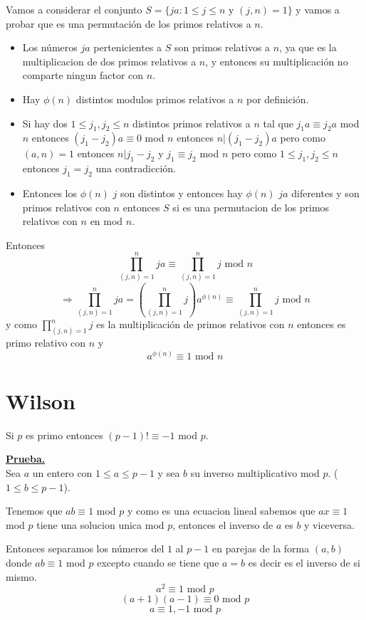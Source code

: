 \documentclass[11pt]{scrartcl}
\begin{document}
Vamos a considerar el conjunto $S=\{ja: 1\leq j \leq n \text{ y } (j,n)=1\}$ y vamos a probar que es una permutación de los primos relativos a $n$.
\begin{itemize}
\item Los números $ja$ pertenicientes a $S$ son primos relativos a $n$, ya que es la multiplicacion de dos primos relativos a $n$, y entonces su multiplicación no comparte ningun factor con $n$.
\item Hay $\phi (n)$ distintos modulos primos relativos a $n$ por definición.
\item Si hay dos $1\leq j_1,j_2 \leq n$ distintos primos relativos a $n$ tal que $j_1a\equiv j_2 a$ mod $n$ entonces $(j_1-j_2)a\equiv 0$ mod $n$ entonces $n|(j_1-j_2)a$ pero como $(a,n)=1$ entonces $n|j_1-j_2$ y $j_1\equiv j_2$ mod $n$ pero como $1\leq j_1,j_2 \leq n$ entonces $j_1=j_2$ una contradicción.
\item Entonces los $\phi (n)$ $j$ son distintos y entonces hay $\phi (n)$ $ja$ diferentes y son primos relativos con $n$ entonces $S$ si es una permutacion de los primos relativos con $n$ en mod $n$.
\end{itemize}
Entonces 
$$\prod_{(j,n)=1}^{n} ja \equiv \prod_{(j,n)=1}^{n} j \text{ mod } n $$
$$\Rightarrow \prod_{(j,n)=1}^{n} ja = (\prod_{(j,n)=1}^{n}j) a^{\phi (n)} \equiv \prod_{(j,n)=1}^{n} j \text{ mod } n$$
y como $\prod_{(j,n)=1}^{n} j$ es la multiplicación de primos relativos con $n$ entonces es primo relativo con $n$ y 
$$a^{\phi(n)}\equiv 1 \text{ mod } n$$


\section{Wilson}
\begin{theorem}
Si $p$ es primo entonces $(p-1)! \equiv -1$ mod $p$. 
\end{theorem}

\underline{\textbf{Prueba.}} \\

Sea $a$ un entero con $1\leq a \leq p-1$ y sea $b$ su inverso multiplicativo mod $p$. ($1\leq b \leq p-1$).

Tenemos que $ab\equiv 1$ mod $p$  y como es una ecuacion lineal sabemos que $ax\equiv 1$ mod $p$ tiene una solucion unica mod $p$, entonces el inverso de $a$ es $b$ y viceversa.

Entonces separamos los números del $1$ al $p-1$ en parejas de la forma $(a,b)$ donde $ab\equiv 1$ mod $p$ excepto cuando se tiene que $a=b$ es decir es el inverso de si mismo.
$$a^2\equiv 1 \text{ mod } p $$
$$(a+1)(a-1) \equiv 0 \text{ mod } p$$
$$a\equiv 1,-1 \text{ mod } p$$
\end{document}
